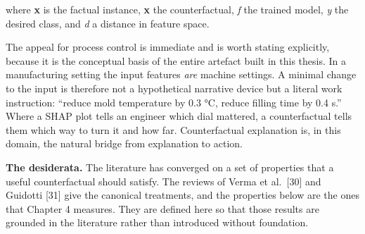 where \textbf{x} is the factual instance, \textbf{x}\textquotesingle{} the counterfactual, \emph{f} the trained model, \emph{y}\textquotesingle{} the desired class, and \emph{d} a distance in feature space.

The appeal for process control is immediate and is worth stating explicitly, because it is the conceptual basis of the entire artefact built in this thesis. In a manufacturing setting the input features \emph{are} machine settings. A minimal change to the input is therefore not a hypothetical narrative device but a literal work instruction: ``reduce mold temperature by 0.3 °C, reduce filling time by 0.4 s.'' Where a SHAP plot tells an engineer which dial mattered, a counterfactual tells them which way to turn it and how far. Counterfactual explanation is, in this domain, the natural bridge from explanation to action.

\textbf{The desiderata.} The literature has converged on a set of properties that a useful counterfactual should satisfy. The reviews of Verma et al.~{[}30{]} and Guidotti {[}31{]} give the canonical treatments, and the properties below are the ones that Chapter 4 measures. They are defined here so that those results are grounded in the literature rather than introduced without foundation.

